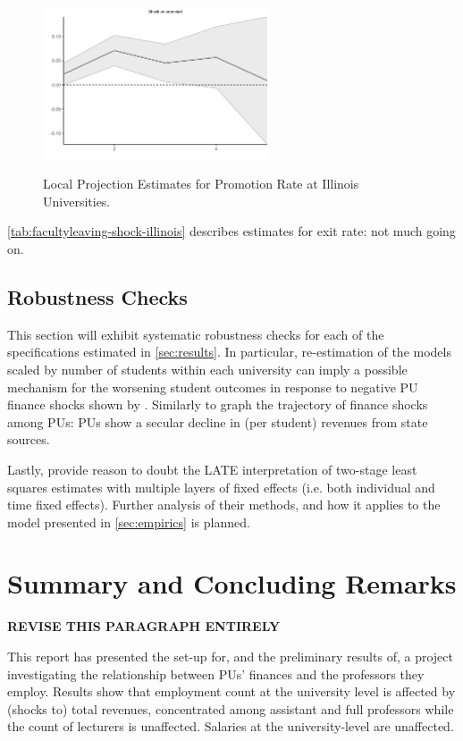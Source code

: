 \documentclass[notitlepage,12pt]{article}
\begin{document}
\begin{figure}[h!]
    \centering
    \caption{Local Projection Estimates for Promotion Rate at Illinois Universities.}
    \includegraphics[width=0.6\textwidth]{figures/promoted-illinois-lp.png}
    \label{fig:promoted-illinois-lp}
\end{figure}

\autoref{tab:facultyleaving-shock-illinois} describes estimates for exit rate: not much going on.

\newpage
\subsection{Robustness Checks}

This section will exhibit systematic robustness checks for each of the specifications estimated in \autoref{sec:results}.
In particular, re-estimation of the models scaled by number of students within each university can imply a possible mechanism for the worsening student outcomes in response to negative PU finance shocks shown by \cite{NBERw23736,NBERw27885}.
Similarly to graph the trajectory of finance shocks among PUs: PUs show a secular decline in (per student) revenues from state sources.

Lastly, \cite{blandhol2022tsls} provide reason to doubt the LATE interpretation of two-stage least squares estimates with multiple layers of fixed effects (i.e. both individual and time fixed effects).
Further analysis of their methods, and how it applies to the model presented in \autoref{sec:empirics} is planned.


\section{Summary and Concluding Remarks}
\label{sec:conclusion}


\textbf{REVISE THIS PARAGRAPH ENTIRELY}

This report has presented the set-up for, and the preliminary results of, a project investigating the relationship between PUs' finances and the professors they employ.
Results show that employment count at the university level is affected by (shocks to) total revenues, concentrated among assistant and full professors while the count of lecturers is unaffected.
Salaries at the university-level are unaffected.
\end{document}
